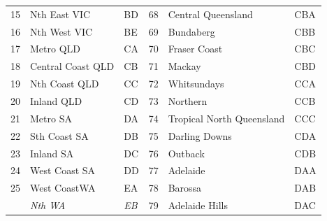 \documentclass[a4paper,11pt]{article}
\theoremstyle{definition}
\begin{document}
\begin{table}[H]
\begin{tabular}{r l l|r l l}
		15                                   & Nth East VIC            & BD             & 68                                              & Central Queensland              & CBA            \\
		16                                   & Nth West VIC            & BE             & 69                                              & Bundaberg                       & CBB            \\
		17                                   & Metro QLD               & CA             & 70                                              & Fraser Coast                    & CBC            \\
		18                                   & Central Coast QLD       & CB             & 71                                              & Mackay                          & CBD            \\
		19                                   & Nth Coast QLD           & CC             & 72                                              & Whitsundays                     & CCA            \\
		20                                   & Inland QLD              & CD             & 73                                              & Northern                        & CCB            \\
		21                                   & Metro SA                & DA             & 74                                              & Tropical North Queensland       & CCC            \\
		22                                   & Sth Coast SA            & DB             & 75                                              & Darling Downs                   & CDA            \\
		23                                   & Inland SA               & DC             & 76                                              & Outback                         & CDB            \\
		24                                   & West Coast SA           & DD             & 77                                              & Adelaide                        & DAA            \\
		25                                   & West CoastWA            & EA             & 78                                              & Barossa                         & DAB            \\
		                                     & \textit{Nth WA}         & \textit{EB}    & 79                                              & Adelaide Hills                  & DAC            \\

\end{tabular}
\end{table}
\end{document}
